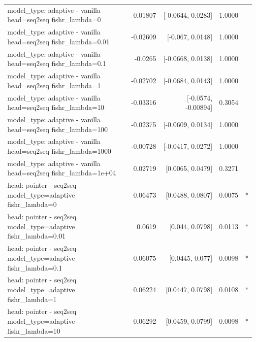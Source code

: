 \documentclass[10pt]{article}
\makeatletter
\newcommand{\stackcell}[1]{\begin{tabular}[t]{@{}l@{}}#1\end{tabular}}
\makeatother
\begin{document}
{\begin{longtable}{lrrrl}
\stackcell{model\_type: adaptive - vanilla\\\footnotesize head=seq2seq fishr\_lambda=0 } & -0.01807 & [-0.0644, 0.0283] & 1.0000 & \\
\stackcell{model\_type: adaptive - vanilla\\\footnotesize head=seq2seq fishr\_lambda=0.01 } & -0.02609 & [-0.067, 0.0148] & 1.0000 & \\
\stackcell{model\_type: adaptive - vanilla\\\footnotesize head=seq2seq fishr\_lambda=0.1 } & -0.0265 & [-0.0668, 0.0138] & 1.0000 & \\
\stackcell{model\_type: adaptive - vanilla\\\footnotesize head=seq2seq fishr\_lambda=1 } & -0.02702 & [-0.0684, 0.0143] & 1.0000 & \\
\stackcell{model\_type: adaptive - vanilla\\\footnotesize head=seq2seq fishr\_lambda=10 } & -0.03316 & [-0.0574, -0.00894] & 0.3054 & \\
\stackcell{model\_type: adaptive - vanilla\\\footnotesize head=seq2seq fishr\_lambda=100 } & -0.02375 & [-0.0609, 0.0134] & 1.0000 & \\
\stackcell{model\_type: adaptive - vanilla\\\footnotesize head=seq2seq fishr\_lambda=1000 } & -0.00728 & [-0.0417, 0.0272] & 1.0000 & \\
\stackcell{model\_type: adaptive - vanilla\\\footnotesize head=seq2seq fishr\_lambda=1e+04 } & 0.02719 & [0.0065, 0.0479] & 0.3271 & \\
\stackcell{head: pointer - seq2seq\\\footnotesize model\_type=adaptive fishr\_lambda=0 } & 0.06473 & [0.0488, 0.0807] & 0.0075 & *\\
\stackcell{head: pointer - seq2seq\\\footnotesize model\_type=adaptive fishr\_lambda=0.01 } & 0.0619 & [0.044, 0.0798] & 0.0113 & *\\
\stackcell{head: pointer - seq2seq\\\footnotesize model\_type=adaptive fishr\_lambda=0.1 } & 0.06075 & [0.0445, 0.077] & 0.0098 & *\\
\stackcell{head: pointer - seq2seq\\\footnotesize model\_type=adaptive fishr\_lambda=1 } & 0.06224 & [0.0447, 0.0798] & 0.0108 & *\\
\stackcell{head: pointer - seq2seq\\\footnotesize model\_type=adaptive fishr\_lambda=10 } & 0.06292 & [0.0459, 0.0799] & 0.0098 & *\\

\end{longtable}}
\end{document}
